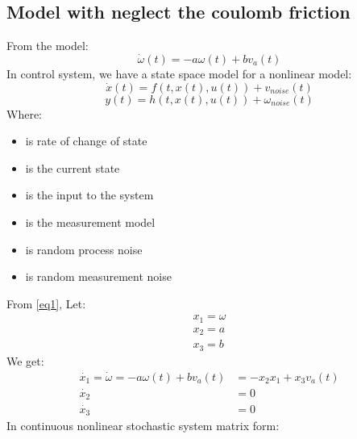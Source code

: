 \documentclass[12pt,a4paper]{article}
\begin{document}
	\subsection{Model with neglect the coulomb friction}
	From the model:
	\begin{equation}
		\dot{\omega}(t) = - a \omega(t) + b v_a(t)
		\label{eq1}
	\end{equation}
	In control system, we have a state space model for a nonlinear model:
	\[\dot{x}(t) = f(t,x(t),u(t)) + v_{noise}(t)\]
	\[y(t) = h(t,x(t),u(t)) + \omega_{noise}(t)\]
	Where:
	\begin{itemize}
		\item { is rate of change of state }
		\item { is the current state}
		\item { is the input to the system}
		\item { is the measurement model}
		\item { is random process noise}
		\item { is random measurement noise}
	\end{itemize}
	From \autoref{eq1}, Let:
	\begin{equation}
		\begin{split}
			x_1 = \omega\\
			x_2 = a\\
			x_3 = b
		\end{split}
		\label{eq2}
	\end{equation}
	We get:
	\begin{equation}
		\begin{split}
			\dot{x_1} = \dot{\omega} = - a \omega(t) + b v_a(t) &= -x_2 x_1 + x_3 v_a(t)\\
			\dot{x_2} &= 0 \\
			\dot{x_3} &= 0
		\end{split}
		\label{eq3}
	\end{equation}
	In continuous nonlinear stochastic system matrix form:
\end{document}
